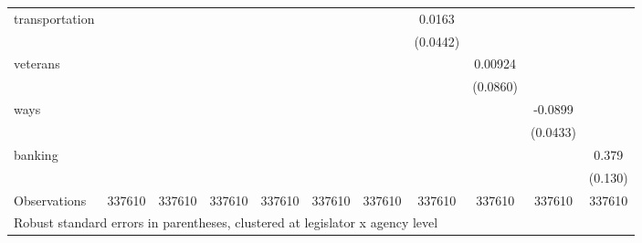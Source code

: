 \begin{tabular}{l*{10}{c}}
transportation      &            &            &            &            &            &            &      0.0163&            &            &            \\
                    &            &            &            &            &            &            &    (0.0442)&            &            &            \\
veterans            &            &            &            &            &            &            &            &     0.00924&            &            \\
                    &            &            &            &            &            &            &            &    (0.0860)&            &            \\
ways                &            &            &            &            &            &            &            &            &     -0.0899&            \\
                    &            &            &            &            &            &            &            &            &    (0.0433)&            \\
banking             &            &            &            &            &            &            &            &            &            &       0.379\\
                    &            &            &            &            &            &            &            &            &            &     (0.130)\\
\midrule
Observations        &      337610&      337610&      337610&      337610&      337610&      337610&      337610&      337610&      337610&      337610\\
\bottomrule
\multicolumn{11}{l}{\footnotesize Robust standard errors in parentheses, clustered at legislator x agency level}\\
\end{tabular}
